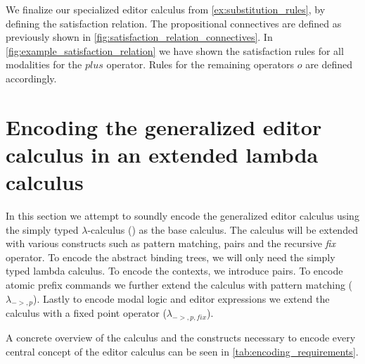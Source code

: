 \documentclass[sigplan,anonymous,review]{acmart}
\begin{document}
\begin{example}\label{ex:modal_logic}
    We finalize our specialized editor calculus from \cref{ex:substitution_rules}, by defining the satisfaction relation. The propositional connectives are defined as previously shown in \cref{fig:satisfaction_relation_connectives}. In \cref{fig:example_satisfaction_relation} we have shown the satisfaction rules for all modalities for the $plus$ operator. Rules for the remaining operators $o$ are defined accordingly.
\end{example}

\section{Encoding the generalized editor calculus in an extended lambda calculus} \label{sec:encoding}
In this section we attempt to soundly encode the generalized editor calculus using the simply typed $\lambda$-calculus (\stlc) as the base calculus. The calculus will be extended with various constructs such as pattern matching, pairs and the recursive \textit{fix} operator. To encode the abstract binding trees, we will only need the simply typed lambda calculus. To encode the contexts, we introduce pairs. To encode atomic prefix commands we further extend the calculus with pattern matching ($\lambda_{->,p}$). Lastly to encode modal logic and editor expressions we extend the calculus with a fixed point operator ($\lambda_{->,p,fix}$). 

A concrete overview of the calculus and the constructs necessary to encode every central concept of the editor calculus can be seen in \cref{tab:encoding_requirements}.
\end{document}
